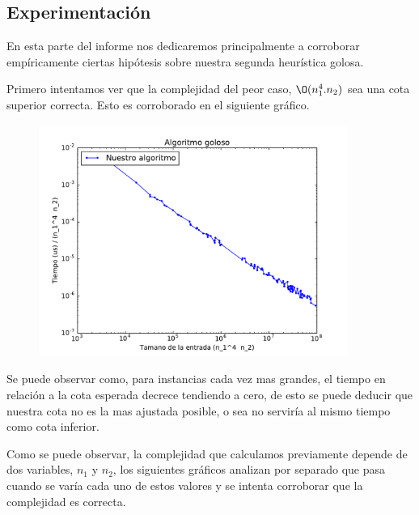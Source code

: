 \subsection{Experimentación}

En esta parte del informe nos dedicaremos principalmente a corroborar empíricamente ciertas hipótesis sobre nuestra segunda heurística golosa.

Primero intentamos ver que la complejidad del peor caso, $\O(n_1^4.n_2)$ sea una cota superior correcta. Esto es corroborado en el siguiente gráfico.

\begin{figure}[H]
 \centering
	\includegraphics[width=0.9\textwidth]{graficos/problema_4/tiempos_1.pdf}
	\caption{}
	\label{fig:problema4-1}
\end{figure}

Se puede observar como, para instancias cada vez mas grandes, el tiempo en relación a la cota esperada decrece tendiendo a cero, de esto se puede deducir que nuestra cota no es la mas ajustada posible, o sea no serviría al mismo tiempo como cota inferior.

Como se puede observar, la complejidad que calculamos previamente depende de dos variables, $n_1$ y $n_2$, los siguientes gráficos analizan por separado que pasa cuando se varía cada uno de estos valores y se intenta corroborar que la complejidad es correcta.

